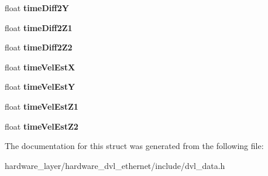 \begin{DoxyCompactItemize}
float {\bfseries time\+Diff2Y}
\item 
\mbox{\label{structDVLData_a2fd590963df7f99255eb25cedddee0dd}} 
float {\bfseries time\+Diff2\+Z1}
\item 
\mbox{\label{structDVLData_ac0e9b12ec15d14692a60e63a4ac28bf6}} 
float {\bfseries time\+Diff2\+Z2}
\item 
\mbox{\label{structDVLData_a7cc2c76c6cdb0cc57917c3fc33e4a803}} 
float {\bfseries time\+Vel\+EstX}
\item 
\mbox{\label{structDVLData_a3253ed16b2c8fc36d1f8897c67378975}} 
float {\bfseries time\+Vel\+EstY}
\item 
\mbox{\label{structDVLData_a96d37886f690d7e7a757f1f2a021e92b}} 
float {\bfseries time\+Vel\+Est\+Z1}
\item 
\mbox{\label{structDVLData_a6a63a73113c613b8f92caf59da3a41aa}} 
float {\bfseries time\+Vel\+Est\+Z2}
\end{DoxyCompactItemize}


The documentation for this struct was generated from the following file\+:\begin{DoxyCompactItemize}
\item 
hardware\+\_\+layer/hardware\+\_\+dvl\+\_\+ethernet/include/dvl\+\_\+data.\+h\end{DoxyCompactItemize}
